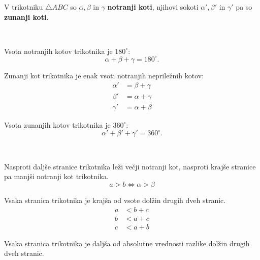         V trikotniku $\triangle ABC$  so $\alpha, \beta$ in $\gamma$ \textbf{notranji koti}, njihovi sokoti $\alpha', \beta'$ in $\gamma'$ pa so \textbf{zunanji koti}. 
            
        ~\\
            
        \begin{izrek}
            Vsota notranjih kotov trikotnika je $180^\circ$: 
            $$\alpha+\beta+\gamma=180^\circ.$$ 
        \end{izrek}

        
        \begin{izrek}
            Zunanji kot trikotnika je enak vsoti notranjih nepriležnih kotov: 
            \begin{align*}
                \alpha' &= \beta+\gamma \\
                \beta' &= \alpha+\gamma \\
                \gamma' &= \alpha+\beta
            \end{align*}
        \end{izrek}

        
        \begin{izrek}
            Vsota zunanjih kotov trikotnika je $360^\circ$: 
            $$\alpha'+\beta'+\gamma'=360^\circ.$$ 
        \end{izrek}


        ~~

    
        
        \begin{izrek}
            Nasproti daljše stranice trikotnika leži večji notranji kot, nasproti krajše stranice pa manjši notranji kot trikotnika.
            $$a>b \Leftrightarrow \alpha > \beta$$
        \end{izrek}

        
        \begin{izrek}
            Vsaka stranica trikotnika je krajša od vsote dolžin drugih dveh stranic.
            \begin{align*}
                a &< b + c \\
                b &< a + c \\
                c &< a + b
            \end{align*}
        \end{izrek}

        
        \begin{izrek}
            Vsaka stranica trikotnika je daljša od absolutne vrednosti razlike dolžin drugih dveh stranic.
        \end{izrek}




